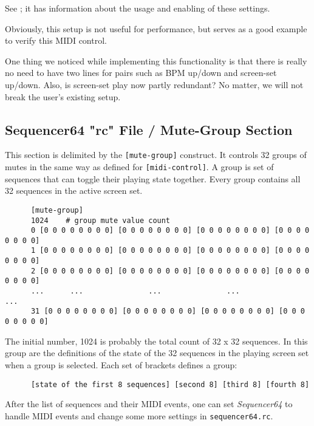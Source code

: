    See ; it has
   information about the usage and enabling of these settings.

   Obviously, this setup is not useful for performance, but serves as a good
   example to verify this MIDI control.

   One thing we noticed while implementing this functionality is that there
   is really no need to have two lines for pairs such as BPM up/down and
   screen-set up/down.  Also, is screen-set play now partly redundant?
   No matter, we will not break the user's existing setup.

\subsection{Sequencer64 "rc" File / Mute-Group Section}
\label{subsec:seq64_rc_file_mute_group}
     
   This section is delimited by the \texttt{[mute-group]} construct.
   It controls 32 groups of mutes in the same way as defined for
   \texttt{[midi-control]}. A group is set of sequences that can toggle their
   playing state together.  Every group contains all 32 sequences in the
   active screen set.

   \begin{verbatim}
      [mute-group]
      1024    # group mute value count
      0 [0 0 0 0 0 0 0 0] [0 0 0 0 0 0 0 0] [0 0 0 0 0 0 0 0] [0 0 0 0 0 0 0 0]
      1 [0 0 0 0 0 0 0 0] [0 0 0 0 0 0 0 0] [0 0 0 0 0 0 0 0] [0 0 0 0 0 0 0 0]
      2 [0 0 0 0 0 0 0 0] [0 0 0 0 0 0 0 0] [0 0 0 0 0 0 0 0] [0 0 0 0 0 0 0 0]
      ...      ...               ...               ...               ...
      31 [0 0 0 0 0 0 0 0] [0 0 0 0 0 0 0 0] [0 0 0 0 0 0 0 0] [0 0 0 0 0 0 0 0]
   \end{verbatim}

   The initial number, 1024 is probably the total count of 32 x 32 sequences.
   In this group are the definitions of the state of the 32 sequences
   in the playing screen set when a group is selected.
   Each set of brackets defines a group:
   
   \begin{verbatim}
      [state of the first 8 sequences] [second 8] [third 8] [fourth 8]
   \end{verbatim}

   After the list of sequences and their MIDI events, one can 
   set \textsl{Sequencer64} to handle MIDI events and change some more settings
   in \texttt{sequencer64.rc}.

